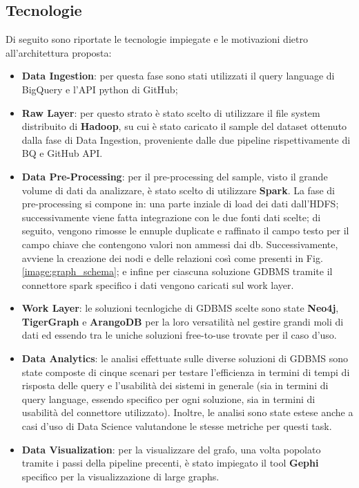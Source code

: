 \documentclass[11pt]{article}
\begin{document}
\subsection{Tecnologie}
Di seguito sono riportate le tecnologie impiegate e le motivazioni dietro all'architettura proposta:
\begin{itemize}
    \item \textbf{Data Ingestion}: per questa fase sono stati utilizzati il query language di BigQuery e l'API python di GitHub;
    \item \textbf{Raw Layer}: per questo strato è stato scelto di utilizzare il file system distribuito di \textbf{Hadoop}, su cui è stato caricato il sample del dataset ottenuto dalla fase di Data Ingestion, proveniente dalle due pipeline rispettivamente di BQ e GitHub API.
    \item \textbf{Data Pre-Processing}: per il pre-processing del sample, visto il grande volume di dati da analizzare, è stato scelto di utilizzare \textbf{Spark}. La fase di pre-processing si compone in: una parte inziale di load dei dati dall'HDFS; successivamente viene fatta integrazione con le due fonti dati scelte; di seguito, vengono rimosse le ennuple duplicate e raffinato il campo testo per il campo chiave che contengono valori non ammessi dai db. Successivamente, avviene la creazione dei nodi e delle relazioni così come presenti in Fig.\ref{image:graph_schema}; e infine per ciascuna soluzione GDBMS tramite il connettore spark specifico i dati vengono caricati sul work layer.
    \item \textbf{Work Layer}: le soluzioni tecnlogiche di GDBMS scelte sono state \textbf{Neo4j}, \textbf{TigerGraph} e \textbf{ArangoDB} per la loro versatilità nel gestire grandi moli di dati ed essendo tra le uniche soluzioni free-to-use trovate per il caso d'uso.
    \item \textbf{Data Analytics}: le analisi effettuate sulle diverse soluzioni di GDBMS sono state composte di cinque scenari per testare l'efficienza in termini di tempi di risposta delle query e l'usabilità dei sistemi in generale (sia in termini di query language, essendo specifico per ogni soluzione, sia in termini di usabilità del connettore utilizzato). Inoltre, le analisi sono state estese anche a casi d'uso di Data Science valutandone le stesse metriche per questi task.
    \item \textbf{Data Visualization}: per la visualizzare del grafo, una volta popolato tramite i passi della pipeline precenti, è stato impiegato il tool \textbf{Gephi} specifico per la visualizzazione di large graphs.
\end{itemize}
\end{document}
